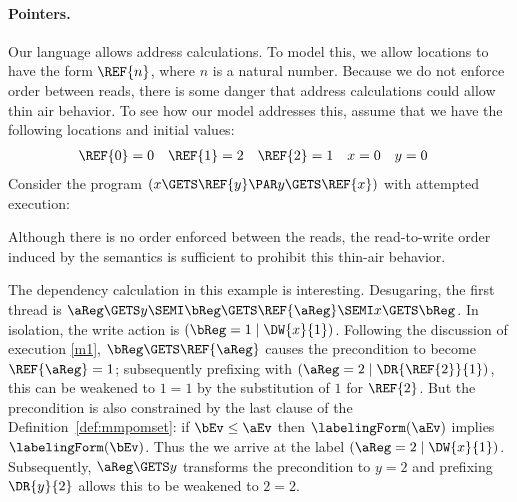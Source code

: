 \paragraph{Pointers.}
Our language allows address calculations.  To model this, we allow locations
to have the form $\REF{n}$, where $n$ is a natural number.  Because we do not
enforce order between reads, there is some danger that address calculations
could allow thin air behavior.   To see how our model addresses this, assume
that we have the following locations and initial values:
\begin{align*}
  \REF{0}&=0  &
  \REF{1}&=2  &
  \REF{2}&=1  &
  x &=0 &
  y &=0 
\end{align*}
Consider the program
\begin{math}
  (x\GETS\REF{y} \PAR y\GETS\REF{x})
\end{math}
with attempted execution:
\begin{tikzdisplay}[node distance=1em]
\end{tikzdisplay}
Although there is no order enforced between the reads, the read-to-write
order induced by the semantics is sufficient to prohibit this thin-air
behavior.

The dependency calculation in this example is interesting.  Desugaring, the
first thread is $\aReg\GETS y\SEMI \bReg\GETS \REF{\aReg}\SEMI x\GETS \bReg$.
In isolation, the write action is $(\bReg=1\mid\DW{x}{1})$.  Following the
discussion of execution \eqref{m1}, $\bReg\GETS \REF{\aReg}$ causes the
precondition to become $\REF{\aReg}=1$; subsequently prefixing with
$(\aReg=2\mid\DR{\REF{2}}{1})$, this can be weakened to $1=1$ by the
substitution of $1$ for $\REF{2}$.  But the precondition is also constrained
by the last clause of the Definition~\ref{def:mmpomset}:
 if $\bEv\le\aEv$ then $\labelingForm(\aEv)$ implies $\labelingForm(\bEv)$.
%
Thus the we arrive at the label $(\aReg=2\mid\DW{x}{1})$.  Subsequently,
$\aReg\GETS y$ transforms the precondition to $y=2$ and prefixing $\DR{y}{2}$
allows this to be weakened to $2=2$.

